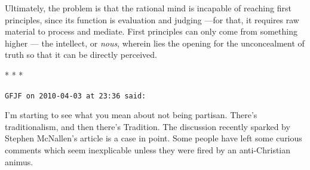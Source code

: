 Ultimately, the problem is that the rational mind is incapable of reaching first principles, since its function is evaluation and judging ---for that, it requires raw material to process and mediate. First principles can only come from something higher --- the intellect, or \emph{nous}, wherein lies the opening for the unconcealment of truth so that it can be directly perceived.



\begin{center}* * *\end{center}

\begin{footnotesize}
\begin{sffamily}
\texttt{GFJF on 2010-04-03 at 23:36 said:}

I'm starting to see what you mean about not being partisan. There's traditionalism, and then there's Tradition. The discussion recently sparked by Stephen McNallen's article is a case in point. Some people have left some curious comments which seem inexplicable unless they were fired by an anti-Christian animus.


\hfill

\end{sffamily}
\end{footnotesize}

